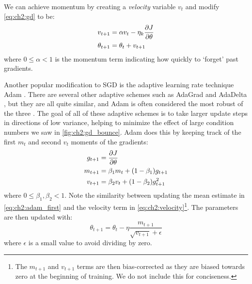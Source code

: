 We can achieve momentum by creating a \emph{velocity} variable $v_{t}$ and modify
\eqref{eq:ch2:gd} to be:
\begin{align}
  v_{t+1} &= \alpha v_t - \eta_k\frac{\partial J}{\partial \theta} \label{eq:ch2:velocity}\\
  \theta_{t+1} &= \theta_t + v_{t+1} 
\end{align}
where $0\leq\alpha<1$ is the momentum term indicating how quickly to `forget'
past gradients.

Another popular modification to SGD is the adaptive learning rate technique Adam
\cite{kingma_adam:_2014}. There are several other adaptive schemes such as
AdaGrad \cite{duchi_adaptive_2011} and AdaDelta \cite{zeiler_adadelta:_2012}, but
they are all quite similar, and Adam is often considered the most robust of the
three \cite{goodfellow_deep_2016}. The goal of all of these adaptive schemes is
to take larger update steps in directions of low variance, helping to minimize
the effect of large condition numbers we saw in \autoref{fig:ch2:gd_bounce}.
Adam does this by keeping track of the first $m_t$ and second $v_t$ moments of the
gradients:
\begin{align}
  g_{t+1} &= \frac{\partial J}{\partial \theta} \\
  m_{t+1} &= \beta_1 m_{t} + (1-\beta_1)g_{t+1} \label{eq:ch2:adam_first}\\
  v_{t+1} &= \beta_2 v_{t} + (1-\beta_2)g_{t+1}^2
\end{align}
where $0 \leq \beta_1, \beta_2 < 1$. Note the similarity between updating the
mean estimate in \eqref{eq:ch2:adam_first} and the velocity term in
\eqref{eq:ch2:velocity}\footnote{The $m_{t+1}$ and $v_{t+1}$ terms are then
bias-corrected as they are biased towards zero at the beginning of training. We
do not include this for conciseness.}. The parameters are then updated with:
\begin{equation}
  \theta_{t+1} = \theta_t - \eta \frac{m_{t+1}}{\sqrt{v_{t+1}} + \epsilon}
\end{equation}
where $\epsilon$ is a small value to avoid dividing by zero. 
